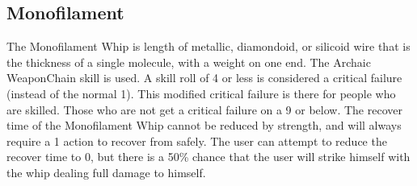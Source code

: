 \documentclass[twoside]{book}
\begin{document}
\subsection{Monofilament}
      The Monofilament Whip is length of metallic,
               diamondoid, or silicoid wire that is the thickness of a
               single molecule, with a weight on one end. The Archaic
               WeaponChain skill is used. A skill roll of 4 or
               less is considered a critical failure (instead of the
               normal 1). This modified critical failure is there for
               people who are skilled. Those who are not get a critical
               failure on a 9 or below.   The recover time of the Monofilament Whip cannot be
               reduced by strength, and will always require a 1 action to
               recover from safely. The user can attempt to reduce the
               recover time to 0, but there is a 50\% chance that the user
               will strike himself with the whip dealing full damage to
               himself. 
\end{document}
